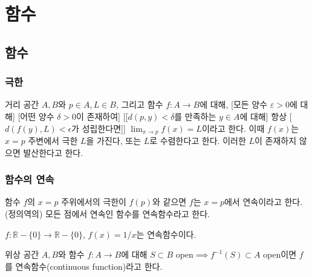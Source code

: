 \part{함수}
\chapter{함수}
\section{극한}\label{sec:lim}
\begin{definition}\label{def:e-d}
    거리 공간 $A, B$와 $p\in A, L\in B$, 그리고 함수 $f:A\to B$에 대해, [모든 양수 $\varepsilon>0$에 대해] [어떤 양수 $\delta>0$이 존재하여] [[$d(p, y)<\delta$를 만족하는 $y\in A$에 대해] 항상 [$d(f(y), L)<\epsilon$가 성립한다면]] $\lim_{x\to p}f(x)=L$이라고 한다. 이때 $f(x)$는 $x=p$ 주변에서 극한 $L$을 가진다, 또는 $L$로 수렴한다고 한다. 이러한 $L$이 존재하지 않으면 발산한다고 한다.
\end{definition}
\section{함수의 연속}\label{sec:cont}
\begin{definition}
    함수 $f$의 $x=p$ 주위에서의 극한이 $f(p)$와 같으면 $f$는 $x=p$에서 연속이라고 한다. (정의역의) 모든 점에서 연속인 함수를 연속함수라고 한다. 
\end{definition}
\begin{remark}
    $f: \mathbb{R}-\{0\}\to \mathbb{R}-\{0\}$, $f(x)=1/x$는 연속함수이다. 
\end{remark}
\begin{definition}\label{def:cont-top}
    위상 공간 $A, B$와 함수 $f:A\to B$에 대해 $S\subset B$ open$\implies f^{-1}(S)\subset A$ open이면 $f$를 연속함수(continuous function)라고 한다. 
\end{definition}
\begin{theorem}[중간값 정리]\label{thm:ivt}
    
\end{theorem}
